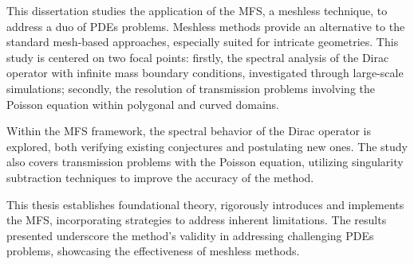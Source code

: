 \acresetall
\noindent
This dissertation studies the application of the \ac{MFS}, a meshless technique, to address a duo of \acp{PDE} problems. Meshless methods provide an alternative to the standard mesh-based approaches, especially suited for intricate geometries. This study is centered on two focal points: firstly, the spectral analysis of the Dirac operator with infinite mass boundary conditions, investigated through large-scale simulations; secondly, the resolution of transmission problems involving the Poisson equation within polygonal and curved domains.

Within the \ac{MFS} framework, the spectral behavior of the Dirac operator is explored, both verifying existing conjectures and postulating new ones. The study also covers transmission problems with the Poisson equation, utilizing singularity subtraction techniques to improve the accuracy of the method.

This thesis establishes foundational theory, rigorously introduces and implements the \ac{MFS}, incorporating strategies to address inherent limitations. The results presented underscore the method's validity in addressing challenging \acp{PDE} problems, showcasing the effectiveness of meshless methods.